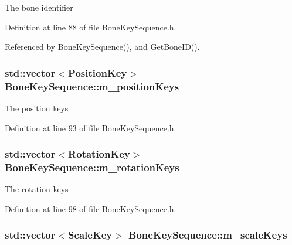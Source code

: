 The bone identifier 



Definition at line 88 of file Bone\+Key\+Sequence.\+h.



Referenced by Bone\+Key\+Sequence(), and Get\+Bone\+I\+D().

\subsubsection[{\texorpdfstring{m\+\_\+position\+Keys}{m_positionKeys}}]{\setlength{\rightskip}{0pt plus 5cm}std\+::vector$<${\bf Position\+Key}$>$ Bone\+Key\+Sequence\+::m\+\_\+position\+Keys\hspace{0.3cm}{\ttfamily [private]}}\hypertarget{class_bone_key_sequence_acae9becd7de02c955da5d64050513ce5}{}\label{class_bone_key_sequence_acae9becd7de02c955da5d64050513ce5}


The position keys 



Definition at line 93 of file Bone\+Key\+Sequence.\+h.

\subsubsection[{\texorpdfstring{m\+\_\+rotation\+Keys}{m_rotationKeys}}]{\setlength{\rightskip}{0pt plus 5cm}std\+::vector$<${\bf Rotation\+Key}$>$ Bone\+Key\+Sequence\+::m\+\_\+rotation\+Keys\hspace{0.3cm}{\ttfamily [private]}}\hypertarget{class_bone_key_sequence_abb6be9db9c5bdc089b6ae7ea6bdae0e3}{}\label{class_bone_key_sequence_abb6be9db9c5bdc089b6ae7ea6bdae0e3}


The rotation keys 



Definition at line 98 of file Bone\+Key\+Sequence.\+h.

\subsubsection[{\texorpdfstring{m\+\_\+scale\+Keys}{m_scaleKeys}}]{\setlength{\rightskip}{0pt plus 5cm}std\+::vector$<${\bf Scale\+Key}$>$ Bone\+Key\+Sequence\+::m\+\_\+scale\+Keys\hspace{0.3cm}{\ttfamily [private]}}\hypertarget{class_bone_key_sequence_a9a1a5986127adf2f67411d8802463c36}{}\label{class_bone_key_sequence_a9a1a5986127adf2f67411d8802463c36}


